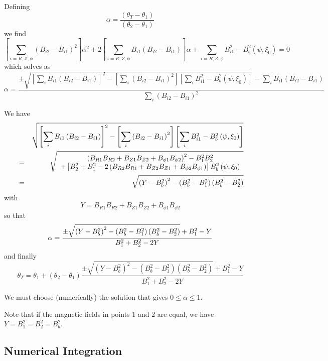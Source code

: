 \documentclass{article}
\begin{document}
Defining 
\[
\alpha =\frac{\left( \theta _{T}-\theta _{1}\right) }{\left( \theta
_{2}-\theta _{1}\right) } 
\]
we find 
\[
\left[ \sum_{i=R,Z,\phi }\left( B_{i2}-B_{i1}\right) ^{2}\right] \alpha
^{2}+2\left[ \sum_{i=R,Z,\phi }B_{i1}\left( B_{i2}-B_{i1}\right) \right]
\alpha +\sum_{i=R,Z,\phi }B_{i1}^{2}-B_{b}^{2}\left( \psi ,\xi _{0}\right)
=0 
\]
which solves as 
\[
\alpha =\frac{\pm \sqrt{\left[ \sum_{i}B_{i1}\left( B_{i2}-B_{i1}\right)
\right] ^{2}-\left[ \sum_{i}\left( B_{i2}-B_{i1}\right) ^{2}\right] \left[
\sum_{i}B_{i1}^{2}-B_{b}^{2}\left( \psi ,\xi _{0}\right) \right] }%
-\sum_{i}B_{i1}\left( B_{i2}-B_{i1}\right) }{\sum_{i}\left(
B_{i2}-B_{i1}\right) ^{2}} 
\]

We have 
\begin{eqnarray*}
&&\sqrt{\left[ \sum_{i}B_{i1}\left( B_{i2}-B_{i1}\right) \right] ^{2}-\left[
\sum_{i}\left( B_{i2}-B_{i1}\right) ^{2}\right] \left[
\sum_{i}B_{i1}^{2}-B_{b}^{2}\left( \psi ,\xi _{0}\right) \right] } \\
&=&\sqrt{%
\begin{array}{c}
\left( B_{R1}B_{R2}+B_{Z1}B_{Z2}+B_{\phi 1}B_{\phi 2}\right)
^{2}-B_{1}^{2}B_{2}^{2} \\ 
+\left[ B_{2}^{2}+B_{1}^{2}-2\left( B_{R2}B_{R1}+B_{Z2}B_{Z1}+B_{\phi
2}B_{\phi 1}\right) \right] B_{b}^{2}\left( \psi ,\xi _{0}\right)
\end{array}
} \\
&=&\sqrt{\left( Y-B_{b}^{2}\right) ^{2}-\left( B_{b}^{2}-B_{1}^{2}\right)
\left( B_{b}^{2}-B_{2}^{2}\right) }
\end{eqnarray*}
with 
\[
Y=B_{R1}B_{R2}+B_{Z1}B_{Z2}+B_{\phi 1}B_{\phi 2} 
\]
so that 
\[
\alpha =\frac{\pm \sqrt{\left( Y-B_{b}^{2}\right) ^{2}-\left(
B_{b}^{2}-B_{1}^{2}\right) \left( B_{b}^{2}-B_{2}^{2}\right) }+B_{1}^{2}-Y}{%
B_{1}^{2}+B_{2}^{2}-2Y} 
\]
and finally 
\[
\theta _{T}=\theta _{1}+\left( \theta _{2}-\theta _{1}\right) \frac{\pm 
\sqrt{\left( Y-B_{b}^{2}\right) ^{2}-\left( B_{b}^{2}-B_{1}^{2}\right)
\left( B_{b}^{2}-B_{2}^{2}\right) }+B_{1}^{2}-Y}{B_{1}^{2}+B_{2}^{2}-2Y} 
\]

We must choose (numerically) the solution that gives $0\leq \alpha \leq 1$.

Note that if the magnetic fields in points 1 and 2 are equal, we have $%
Y=B_{1}^{2}=B_{2}^{2}=B_{b}^{2}$.

\subsection{Numerical Integration}
\end{document}
